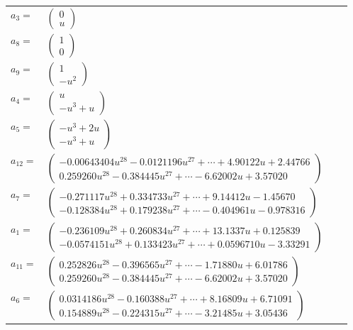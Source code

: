 \documentclass[1p]{elsarticle_modified}
\theoremstyle{definition}
\begin{document}
\begin{tabular}{m{7pt} m{180pt} m{7pt} m{180pt} }
\flushright $a_{3}=$&$\begin{pmatrix}0\\u\end{pmatrix}$ \\
\flushright $a_{8}=$&$\begin{pmatrix}1\\0\end{pmatrix}$ \\
\flushright $a_{9}=$&$\begin{pmatrix}1\\- u^2\end{pmatrix}$ \\
\flushright $a_{4}=$&$\begin{pmatrix}u\\- u^3+u\end{pmatrix}$ \\
\flushright $a_{5}=$&$\begin{pmatrix}- u^3+2 u\\- u^3+u\end{pmatrix}$ \\
\flushright $a_{12}=$&$\begin{pmatrix}-0.00643404 u^{28}-0.0121196 u^{27}+\cdots+4.90122 u+2.44766\\0.259260 u^{28}-0.384445 u^{27}+\cdots-6.62002 u+3.57020\end{pmatrix}$ \\
\flushright $a_{7}=$&$\begin{pmatrix}-0.271117 u^{28}+0.334733 u^{27}+\cdots+9.14412 u-1.45670\\-0.128384 u^{28}+0.179238 u^{27}+\cdots-0.404961 u-0.978316\end{pmatrix}$ \\
\flushright $a_{1}=$&$\begin{pmatrix}-0.236109 u^{28}+0.260834 u^{27}+\cdots+13.1337 u+0.125839\\-0.0574151 u^{28}+0.133423 u^{27}+\cdots+0.0596710 u-3.33291\end{pmatrix}$ \\
\flushright $a_{11}=$&$\begin{pmatrix}0.252826 u^{28}-0.396565 u^{27}+\cdots-1.71880 u+6.01786\\0.259260 u^{28}-0.384445 u^{27}+\cdots-6.62002 u+3.57020\end{pmatrix}$ \\
\flushright $a_{6}=$&$\begin{pmatrix}0.0314186 u^{28}-0.160388 u^{27}+\cdots+8.16809 u+6.71091\\0.154889 u^{28}-0.224315 u^{27}+\cdots-3.21485 u+3.05436\end{pmatrix}$ \\

\end{tabular}
\end{document}

